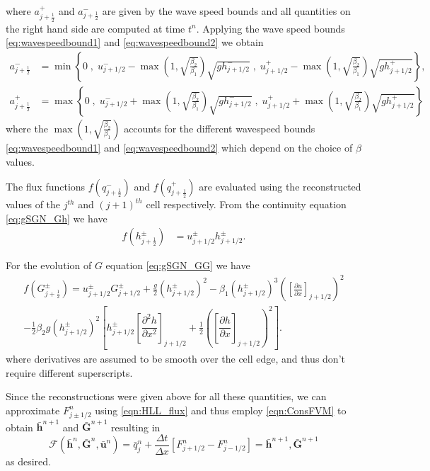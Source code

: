 \documentclass[10pt]{elsarticle}
\newcommand{\vecn}[1]{\boldsymbol{#1}}
\begin{document}
where $a^+_{j+\frac{1}{2}}$ and $a^-_{j+\frac{1}{2}}$ are given by the wave speed bounds and all quantities on the right hand side are computed at time $t^n$. Applying the wave speed bounds \eqref{eq:wavespeedbound1} and \eqref{eq:wavespeedbound2} we obtain
\begin{align}
a^-_{j+\frac{1}{2}} &= \min\left\lbrace 0\;,\;  u^-_{j + 1/2} - \max{\left(1 , \sqrt{\frac{\beta_2}{\beta_1}}\right)} \sqrt{g h^-_{j + 1/2}}  \;,\;u^+_{j + 1/2} -\max{\left(1 , \sqrt{\frac{\beta_2}{\beta_1}}\right)} \sqrt{g h^+_{j + 1/2}} \right\rbrace  ,\\
a^+_{j+\frac{1}{2}} &= \max\left\lbrace 0 \;,\;  u^-_{j + 1/2} + \max{\left(1 , \sqrt{\frac{\beta_2}{\beta_1}}\right)}\sqrt{g h^-_{j + 1/2}}  \;,\;u^+_{j + 1/2} + \max{\left(1 , \sqrt{\frac{\beta_2}{\beta_1}}\right)}\sqrt{g h^+_{j + 1/2}} \right\rbrace
\label{eqn:WaveSpeedBoundsFluxApprox}
\end{align}
where the $\max{\left(1 , \sqrt{\frac{\beta_2}{\beta_1}}\right)}$ accounts for the different wavespeed bounds  \eqref{eq:wavespeedbound1} and \eqref{eq:wavespeedbound2} which depend on the choice of $\beta$ values. 

The flux functions $f(q^-_{j+\frac{1}{2}})$ and $f(q^+_{j+\frac{1}{2}})$ are evaluated using the reconstructed values of the $j^{th}$ and $(j+1)^{th}$ cell respectively. From the continuity equation \eqref{eq:gSGN_Gh} we have
\begin{align*}
f\left(h^\pm_{j+\frac{1}{2}}\right) &= u^\pm_{j + 1/2}  h^\pm_{j + 1/2}.
\end{align*}

For the evolution of $G$ equation \eqref{eq:gSGN_GG} we have 
\begin{multline}
f\left(G^\pm_{j+\frac{1}{2}}\right) =  u^\pm_{j + 1/2} G^\pm_{j + 1/2}  + \frac{g}{2}\left(h^\pm_{j + 1/2} \right)^2 - \beta_1\left(h^\pm_{j + 1/2}\right)^3 \left(\left[\frac{\partial {u}}{\partial x} \right]_{j + 1/2} \right)^2 \\ - \frac{1}{2} \beta_2 g \left(h^\pm_{j + 1/2}\right)^2  \left[h^\pm_{j + 1/2}\left[\dfrac{\partial^2 h}{\partial x^2} \right]_{j+1/2} + \frac{1}{2}\left(\left[\dfrac{\partial h}{\partial x} \right]_{j+1/2}\right)^2\right].
\end{multline}
where derivatives are assumed to be smooth over the cell edge, and thus don't require different superscripts.

Since the reconstructions were given above for all these quantities, we can approximate $F^n_{j\pm1/2}$ using \eqref{eqn:HLL_flux} and thus employ \eqref{eqn:ConsFVM} to obtain $\bar{\vecn{h}}^{n+1}$ and $\bar{\vecn{G}}^{n+1}$ resulting in
\begin{equation}
\mathcal{F}\left(\bar{\vecn{h}}^n,\bar{\vecn{G}}^n,\bar{{\vecn{u}}}^n\right) =   \bar{q}^{n}_j  +  \dfrac{\Delta t}{\Delta x}\left[F^n_{j+1/2} - F^n_{j-1/2}\right] = \bar{\vecn{h}}^{n+1 },\bar{\vecn{G}}^{n+1}
\label{eq:F_secondord}
\end{equation}
as desired. 
\end{document}
